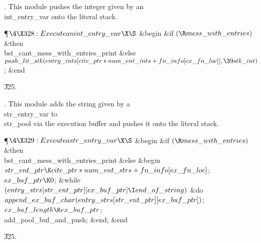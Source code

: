 .
This module pushes the integer given by an \\{int\_entry\_var} onto the
literal stack.

\Y\P$\4\X328:Execute an \\{int\_entry\_var}\X\S$\6
\&{begin} \&{if} $(\R\\{mess\_with\_entries})$ \1\&{then}\5
\\{bst\_cant\_mess\_with\_entries\_print}\6
\4\&{else} $\\{push\_lit\_stk}(\\{entry\_ints}[\\{cite\_ptr}\ast\\{num\_ent%
\_ints}+\\{fn\_info}[\\{ex\_fn\_loc}]],\39\\{stk\_int})$;\2\6
\&{end}\par
\U325.\fi

.
This module adds the string given by a \\{str\_entry\_var} to \\{str\_pool}
via the execution buffer and pushes it onto the literal stack.

\Y\P$\4\X329:Execute a \\{str\_entry\_var}\X\S$\6
\&{begin} \&{if} $(\R\\{mess\_with\_entries})$ \1\&{then}\5
\\{bst\_cant\_mess\_with\_entries\_print}\6
\4\&{else} \&{begin} $\\{str\_ent\_ptr}\K\\{cite\_ptr}\ast\\{num\_ent%
\_strs}+\\{fn\_info}[\\{ex\_fn\_loc}]$;\6
$\\{ex\_buf\_ptr}\K0$;\6
\&{while} $(\\{entry\_strs}[\\{str\_ent\_ptr}][\\{ex\_buf\_ptr}]\I\\{end\_of%
\_string})$ \1\&{do}\6
$\\{append\_ex\_buf\_char}(\\{entry\_strs}[\\{str\_ent\_ptr}][\\{ex\_buf%
\_ptr}])$;\2\6
$\\{ex\_buf\_length}\K\\{ex\_buf\_ptr}$;\5
\\{add\_pool\_buf\_and\_push};\6
\&{end};\2\6
\&{end}\par
\U325.\fi

